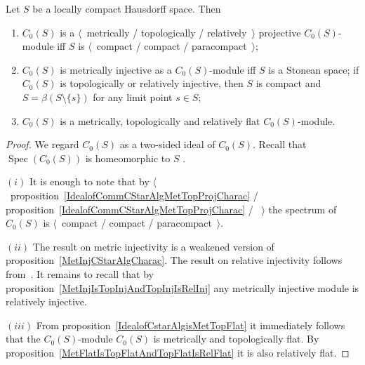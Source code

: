 \begin{proposition}\label{C0SC0SModMetTopRelProjInjFlat} Let $S$ be a locally
compact Hausdorff space. Then

\begin{enumerate}[label = (\roman*)]
    \item $C_0(S)$ is a $\langle$~metrically / 
    topologically / relatively~$\rangle$
    projective $C_0(S)$-module iff $S$ is $\langle$~compact / compact /
    paracompact~$\rangle$;

    \item $C_0(S)$ is metrically injective as a $C_0(S)$-module iff $S$ is 
    a Stonean space; if $C_0(S)$ is topologically or relatively injective, then
    $S$ is compact and $S=\beta(S\setminus \{ s\})$ for any limit point $s\in S$;

    \item $C_0(S)$ is a metrically, topologically and relatively flat 
    $C_0(S)$-module.
\end{enumerate}
\end{proposition}
\begin{proof} We regard $C_0(S)$ as a two-sided ideal of $C_0(S)$. Recall that
$\operatorname{Spec}(C_0(S))$ is homeomorphic to $S$ \cite[corollary 3.1.6]{HelHomolBanTopAlg}.

$(i)$ It is enough to note that by
$\langle$~proposition~\ref{IdealofCommCStarAlgMetTopProjCharac} /
proposition~\ref{IdealofCommCStarAlgMetTopProjCharac} /
\cite[chapter IV,\S\S 2--3]{HelHomolBanTopAlg}~$\rangle$ the spectrum of
$C_0(S)$ is $\langle$~compact / compact / paracompact~$\rangle$. 

$(ii)$ The result on metric injectivity is a weakened version of
proposition~\ref{MetInjCStarAlgCharac}. The result on relative injectivity 
follows from~\cite[theorem 4.4]{NemANoteOnRelInjC0ModC0}. It remains to recall
that by proposition~\ref{MetInjIsTopInjAndTopInjIsRelInj} any metrically injective
module is relatively injective.

$(iii)$ From proposition~\ref{IdealofCstarAlgisMetTopFlat} it immediately follows
that the $C_0(S)$-module $C_0(S)$ is metrically and topologically flat. By
proposition~\ref{MetFlatIsTopFlatAndTopFlatIsRelFlat} it is also relatively
flat.
\end{proof}

